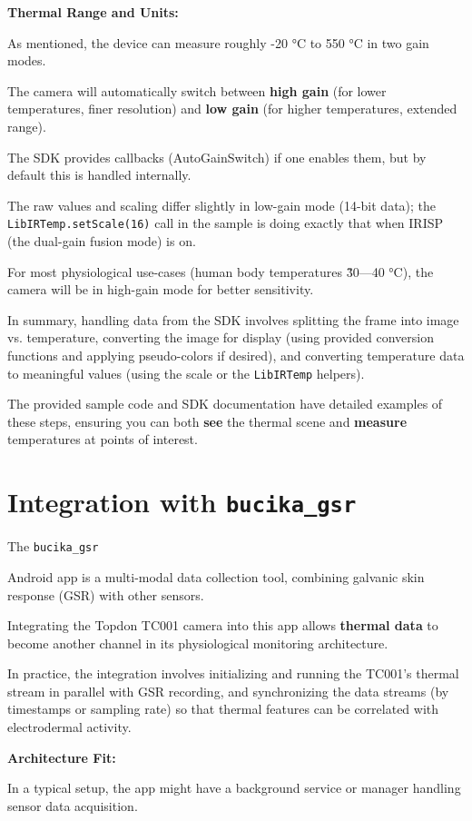 {\textbf{Thermal Range and Units:}

As mentioned, the device can measure roughly -20 °C to 550 °C in two gain modes.

The camera will automatically switch between \textbf{high gain}
 (for lower temperatures, finer resolution) and \textbf{low gain}
 (for higher temperatures, extended range).

The SDK provides callbacks (AutoGainSwitch) if one enables them, but by default
this is handled internally.

The raw values and scaling differ slightly in low-gain mode (14-bit data); the
\texttt{LibIRTemp.setScale(16)} call in the sample is doing exactly that when
IRISP (the dual-gain fusion mode) is on.

For most physiological use-cases (human body temperatures \~30---40 °C), the
camera will be in high-gain mode for better sensitivity.

In summary, handling data from the SDK involves splitting the frame into image
vs. temperature, converting the image for display (using provided conversion
functions and applying pseudo-colors if desired), and converting temperature
data to meaningful values (using the scale or the \texttt{LibIRTemp} helpers).

The provided sample code and SDK documentation have detailed examples of these steps, ensuring you can both \textbf{see}
 the thermal scene and \textbf{measure}
 temperatures at points of interest.

\section{Integration with \texttt{bucika_gsr}
}

The \texttt{bucika_gsr}

Android app is a multi-modal data collection tool, combining galvanic skin
response (GSR) with other sensors.

Integrating the Topdon TC001 camera into this app allows \textbf{thermal data}
 to become another channel in its physiological monitoring architecture.

In practice, the integration involves initializing and running the TC001's
thermal stream in parallel with GSR recording, and synchronizing the data
streams (by timestamps or sampling rate) so that thermal features can be
correlated with electrodermal activity.

\textbf{Architecture Fit:}

In a typical setup, the app might have a background service or manager handling
sensor data acquisition.

}
